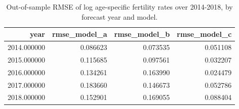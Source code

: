 \begin{table}[ht]
\centering
\begin{tabular}{rrrr}
\hline
year & rmse_model_a & rmse_model_b & rmse_model_c \\
\hline
2014.000000 & 0.086623 & 0.073535 & 0.051108 \\
2015.000000 & 0.115685 & 0.097561 & 0.032207 \\
2016.000000 & 0.134261 & 0.163990 & 0.024479 \\
2017.000000 & 0.183660 & 0.146673 & 0.052786 \\
2018.000000 & 0.152901 & 0.169055 & 0.088404 \\
\hline
\end{tabular}
\caption{Out-of-sample RMSE of log age-specific fertility rates over 2014-2018, by forecast year and model.}
\label{tab:revised_table_e6}
\end{table}

